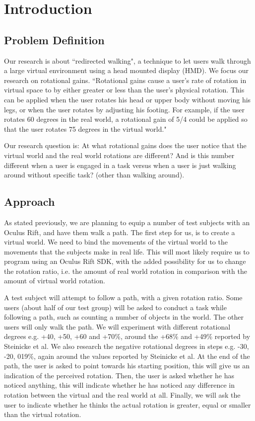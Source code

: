 \section{Introduction}
\subsection{Problem Definition}\label{sec:problem}
Our research is about ``redirected walking", a technique to let users walk through a large virtual environment using a head mounted display (HMD).
We focus our research on rotational gains.
``Rotational gains cause a user's rate of rotation in virtual space to by either greater or less than 
the user's physical rotation. This can be applied when the user rotates his head or upper body 
without moving his legs, or when the user rotates by adjusting his footing. For example, if the 
user rotates 60 degrees in the real world, a rotational gain of 5/4 could be applied so that the 
user rotates 75 degrees in the virtual world."\cite{jwalker}

Our research question is: At what rotational gains does the user notice that the virtual world and the real world rotations are different? And is this number different when a user is engaged in a task versus when a user is just walking around without specific task? (other than walking around).

\subsection{Approach}\label{sec:approach}
As stated previously, we are planning to equip a number of test subjects with an Oculus Rift, and have them walk a path.
The first step for us, is to create a virtual world.
We need to bind the movements of the virtual world to the movements that the subjects make in real life.
This will most likely require us to program using an Oculus Rift SDK, with the added possibility for us to change the rotation ratio, i.e. the amount of real world rotation in comparison with the amount of virtual world rotation.

A test subject will attempt to follow a path, with a given rotation ratio.
Some users (about half of our test group) will be asked to conduct a task while following a path, such as counting a number of objects in the world.
The other users will only walk the path.
We will experiment with different rotational degrees e.g. +40, +50, +60 and +70\%, around the +68\% and +49\% reported by Steinicke et al.\cite{steinicke1}\cite{steinicke2}
We also research the negative rotational degrees in steps e.g. -30, -20, 019\%, again around the values reported by Steinicke et al.
At the end of the path, the user is asked to point towards his starting position, this will give us an indication of the perceived rotation.
Then, the user is asked whether he has noticed anything, this will indicate whether he has noticed any difference in rotation between the virtual and the real world at all.
Finally, we will ask the user to indicate whether he thinks the actual rotation is greater, equal or smaller than the virtual rotation.

